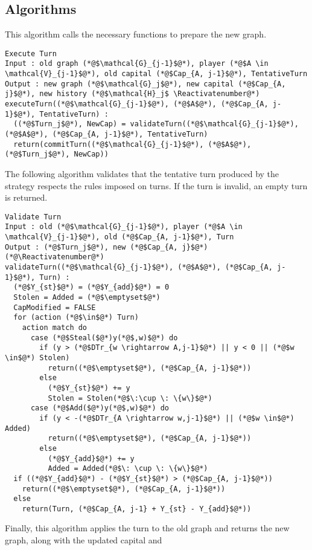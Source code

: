 \documentclass[11pt]{llncs}
\makeatletter
\newcommand*\Suppressnumber{%
  \lst@AddToHook{OnNewLine}{%
    \let\thelstnumber\relax%
     \advance\c@lstnumber-\@ne\relax%
    }%
}
\theoremstyle{definition}
\makeatother
\begin{document}
  \subsection{Algorithms}
    This algorithm calls the necessary functions to prepare the new graph.
    \Suppressnumber
    \begin{lstlisting}[label=executeturn, style=numbers]
Execute Turn
Input : old graph (*@$\mathcal{G}_{j-1}$@*), player (*@$A \in \mathcal{V}_{j-1}$@*), old capital (*@$Cap_{A, j-1}$@*), TentativeTurn
Output : new graph (*@$\mathcal{G}_j$@*), new capital (*@$Cap_{A, j}$@*), new history (*@$\mathcal{H}_j$ \Reactivatenumber@*)
executeTurn((*@$\mathcal{G}_{j-1}$@*), (*@$A$@*), (*@$Cap_{A, j-1}$@*), TentativeTurn) :
  ((*@$Turn_j$@*), NewCap) = validateTurn((*@$\mathcal{G}_{j-1}$@*), (*@$A$@*), (*@$Cap_{A, j-1}$@*), TentativeTurn)
  return(commitTurn((*@$\mathcal{G}_{j-1}$@*), (*@$A$@*), (*@$Turn_j$@*), NewCap))
    \end{lstlisting}
    The following algorithm validates that the tentative turn produced by the strategy respects the rules imposed on turns.
    If the turn is invalid, an empty turn is returned.
    \Suppressnumber
    \begin{lstlisting}[label=validateturn, style=numbers]
Validate Turn
Input : old (*@$\mathcal{G}_{j-1}$@*), player (*@$A \in \mathcal{V}_{j-1}$@*), old (*@$Cap_{A, j-1}$@*), Turn
Output : (*@$Turn_j$@*), new (*@$Cap_{A, j}$@*) (*@\Reactivatenumber@*)
validateTurn((*@$\mathcal{G}_{j-1}$@*), (*@$A$@*), (*@$Cap_{A, j-1}$@*), Turn) :
  (*@$Y_{st}$@*) = (*@$Y_{add}$@*) = 0
  Stolen = Added = (*@$\emptyset$@*)
  CapModified = FALSE
  for (action (*@$\in$@*) Turn)
    action match do
      case (*@$Steal($@*)y(*@$,w)$@*) do
        if (y > (*@$DTr_{w \rightarrow A,j-1}$@*) || y < 0 || (*@$w \in$@*) Stolen)
          return((*@$\emptyset$@*), (*@$Cap_{A, j-1}$@*))
        else
          (*@$Y_{st}$@*) += y
          Stolen = Stolen(*@$\:\cup \: \{w\}$@*)
      case (*@$Add($@*)y(*@$,w)$@*) do
        if (y < -(*@$DTr_{A \rightarrow w,j-1}$@*) || (*@$w \in$@*) Added)
          return((*@$\emptyset$@*), (*@$Cap_{A, j-1}$@*))
        else
          (*@$Y_{add}$@*) += y
          Added = Added(*@$\: \cup \: \{w\}$@*)
  if ((*@$Y_{add}$@*) - (*@$Y_{st}$@*) > (*@$Cap_{A, j-1}$@*))
    return((*@$\emptyset$@*), (*@$Cap_{A, j-1}$@*))
  else
    return(Turn, (*@$Cap_{A, j-1} + Y_{st} - Y_{add}$@*))
    \end{lstlisting}
    Finally, this algorithm applies the turn to the old graph and returns the new graph, along with the updated capital and
\end{document}
